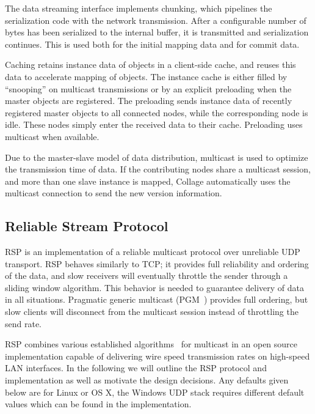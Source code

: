 The data streaming interface implements chunking, which pipelines the
serialization code with the network transmission. After a configurable number of
bytes has been serialized to the internal buffer, it is transmitted and
serialization continues. This is used both for the initial mapping data and for
commit data.

Caching retains instance data of objects in a client-side cache, and reuses this
data to accelerate mapping of objects. The instance cache is either filled by
``snooping'' on multicast transmissions or by an explicit preloading when the
master objects are registered. The preloading sends instance data of recently
registered master objects to all connected nodes, while the corresponding node
is idle. These nodes simply enter the received data to their cache. Preloading
uses multicast when available.

Due to the master-slave model of data distribution, multicast is used to
optimize the transmission time of data. If the contributing nodes share a
multicast session, and more than one slave instance is mapped, \textsf{Collage}
automatically uses the multicast connection to send the new version information.

\subsection{Reliable Stream Protocol}\label{sec:RSP}

RSP is an implementation of a reliable multicast protocol over unreliable UDP
transport. RSP behaves similarly to TCP; it provides full reliability and
ordering of the data, and slow receivers will eventually throttle the sender
through a sliding window algorithm. This behavior is needed to guarantee
delivery of data in all situations. Pragmatic generic multicast (PGM~\cite{pgm})
provides full ordering, but slow clients will disconnect from the multicast
session instead of throttling the send rate.

RSP combines various established algorithms~\cite{adamson2004negative,
  Gau:2002:MFC:506824.506832} for multicast in an open source implementation
capable of delivering wire speed transmission rates on high-speed LAN
interfaces. In the following we will outline the RSP protocol and implementation
as well as motivate the design decisions. Any defaults given below are for
Linux or OS X, the Windows UDP stack requires different default values which can
be found in the implementation.

